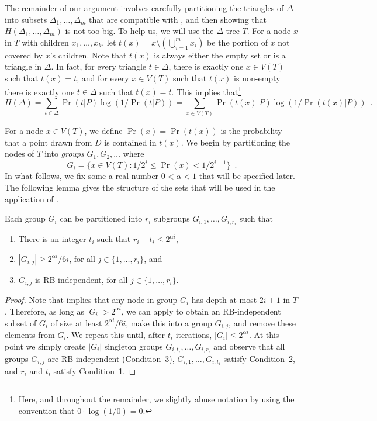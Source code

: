 \documentclass[lotsofwhite]{patmorin}
\begin{document}
The remainder of our argument involves carefully partitioning the
triangles of $\Delta$ into subsets $\Delta_1,\ldots,\Delta_m$ that are
compatible with , and then showing that
$H(\Delta_1,\ldots,\Delta_m)$ is not too big.  To help us, we will use
the $\Delta$-tree $T$.  For a node $x$ in $T$ with children
$x_1,\ldots,x_k$, let $t(x) = x \setminus (\bigcup_{i=1}^m x_i)$ be
the portion of $x$ not covered by $x$'s children.  Note that $t(x)$ is
always either the empty set or is a triangle in $\Delta$.  In fact,
for every triangle $t\in\Delta$, there is exactly one $x\in V(T)$ such
that $t(x)=t$, and for every $x\in V(T)$ such that $t(x)$ is non-empty
there is exactly one $t\in\Delta$ such that $t(x)=t$.  This implies
that\footnote{Here, and throughout the remainder, we slightly abuse notation by
using the convention that $0\cdot\log(1/0)=0$.}
\[
    H(\Delta) = \sum_{t\in\Delta}\Pr(t|P)\log(1/\Pr(t|P)) =
       \sum_{x\in V(T)}\Pr(t(x)|P)\log(1/\Pr(t(x)|P)) \enspace .
\]

For a node $x\in V(T)$, we define $\Pr(x)=\Pr(t(x))$ is the
probability that a point drawn from $D$ is contained in $t(x)$.
We begin by partitioning the nodes of $T$ into
\emph{groups} $G_1,G_2,\ldots$ where
\[
	G_i = \{x\in V(T) : 1/2^{i} \le \Pr(x) < 1/2^{i-1} \} \enspace .
\]
In what follows, we fix some a real number $0< \alpha < 1$ that will be
specified later.   The following lemma gives the structure of the sets
that will be used in the application of .

\begin{lem}
Each group $G_i$ can be partitioned into $r_i$ subgroups
$G_{i,1},\ldots,G_{i,r_i}$ such that
\begin{enumerate}
\item There is an integer $t_i$ such that $r_i-t_i\le 2^{\alpha i}$,

\item $|G_{i,j}| \ge 2^{\alpha i} / 6i$, for all $j\in\{1,\ldots,r_i\}$, and 

\item $G_{i,j}$ is RB-independent, for all $j\in\{1,\ldots,r_i\}$.
\end{enumerate}
\end{lem}

\begin{proof}
Note that  implies that any node in group $G_{i}$ has
depth at most $2i+1$ in $T$.  Therefore, as long as 
$|G_i|>2^{\alpha i}$, we can apply  to obtain
an RB-independent subset of $G_i$ of size at least $2^{\alpha i}/6i$,
make this into a group $G_{i,j}$, and remove these elements from $G_i$.
We repeat this until, after $t_i$ iterations, $|G_i| \le 2^{\alpha
i}$.  At this point we simply create $|G_i|$ singleton groups
$G_{i,t_i},\ldots,G_{i,r_i}$ and observe that
all groups $G_{i,j}$ are RB-independent (Condition~3),
$G_{i,1},\ldots,G_{i,t_i}$ satisfy Condition~2, and $r_i$ and $t_i$ satisfy
Condition~1.
\end{proof}
\end{document}
